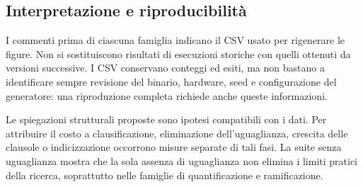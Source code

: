 \subsection{Interpretazione e riproducibilità}
I commenti prima di ciascuna famiglia indicano il CSV usato per rigenerare le figure. Non si sostituiscono risultati di esecuzioni storiche con quelli ottenuti da versioni successive. I CSV conservano conteggi ed esiti, ma non bastano a identificare sempre revisione del binario, hardware, seed e configurazione del generatore: una riproduzione completa richiede anche queste informazioni.

Le spiegazioni strutturali proposte sono ipotesi compatibili con i dati. Per attribuire il costo a clausificazione, eliminazione dell’uguaglianza, crescita delle clausole o indicizzazione occorrono misure separate di tali fasi. La suite senza uguaglianza mostra che la sola assenza di uguaglianza non elimina i limiti pratici della ricerca, soprattutto nelle famiglie di quantificazione e ramificazione.

